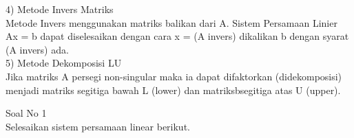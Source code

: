 \begin{eulernotebook}
\begin{eulercomment}
\begin{eulercomment}
\begin{eulercomment}
\begin{eulercomment}
\begin{eulercomment}
4) Metode Invers Matriks\\
Metode Invers menggunakan matriks balikan dari A. Sistem Persamaan
Linier Ax = b dapat diselesaikan dengan cara x = (A invers) dikalikan b dengan syarat (A invers) ada.\\

5) Metode Dekomposisi LU\\
Jika matriks A persegi non-singular maka ia dapat difaktorkan (didekomposisi) menjadi matriks segitiga bawah L (lower) dan matriksbsegitiga atas U (upper).\\

\end{eulercomment}
\begin{eulercomment}

\end{eulercomment}
\begin{eulercomment}
Soal No 1\\
Selesaikan sistem persamaan linear berikut.


\end{eulercomment}
\end{eulercomment}
\end{eulercomment}
\end{eulercomment}
\end{eulercomment}
\end{eulernotebook}
